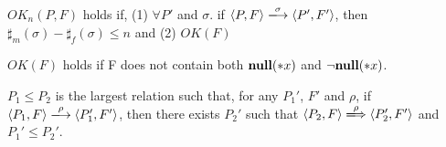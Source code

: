 \begin{myDef}
\label{df:okn}
\(OK_{n}(P, F)\) holds if, (1) \( \forall P'\) and \(\sigma\). if \( \langle P, F \rangle
\xlongrightarrow{\sigma} \langle P', F' \rangle \), then \( \sharp_m(\sigma) - \sharp_f(\sigma) \le n\) and (2) \( OK(F) \)
\end{myDef}

\begin{myDef}
\label{df:okf}
\(OK(F)\) holds if F does not contain both \( {\bf null}(*x) \) and \( \neg{\bf null}(*x) \).
\end{myDef}


\begin{myDef}[Subtyping]
\(P_1 \le P_2\) is the largest relation such that, for any \(P_1'\), \(F'\)
and \(\rho\), if \( \langle P_1, F \rangle \xlongrightarrow{\rho} \langle P_1', F' \rangle \), then there
exists \(P_2'\) such that \( \langle P_2, F \rangle \xLongrightarrow{\rho} \langle P_2', F' \rangle \) and
\(P_1' \le P_2'\).
\label{df:subtype}
\end{myDef}

